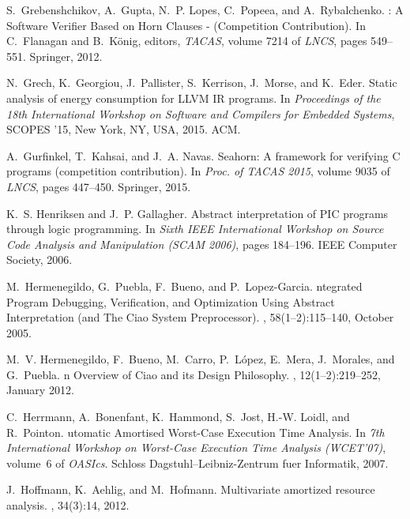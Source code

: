 \documentclass{llncs}
\begin{document}
\begin{thebibliography}{10}
S.~Grebenshchikov, A.~Gupta, N.~P. Lopes, C.~Popeea, and A.~Rybalchenko.
: {A} {S}oftware {V}erifier {B}ased on {H}orn {C}lauses -
  ({C}ompetition {C}ontribution).
\newblock In C.~Flanagan and B.~K{\"o}nig, editors, {\em TACAS}, volume 7214 of
  {\em LNCS}, pages 549--551. Springer, 2012.

N.~Grech, K.~Georgiou, J.~Pallister, S.~Kerrison, J.~Morse, and K.~Eder.
\newblock Static analysis of energy consumption for {LLVM IR} programs.
\newblock In {\em Proceedings of the 18th International Workshop on Software
  and Compilers for Embedded Systems}, SCOPES '15, New York, NY, USA, 2015.
  ACM.

A.~Gurfinkel, T.~Kahsai, and J.~A. Navas.
\newblock Seahorn: {A} framework for verifying {C} programs (competition
  contribution).
\newblock In {\em Proc. of TACAS 2015}, volume 9035 of {\em LNCS}, pages
  447--450. Springer, 2015.

K.~S. Henriksen and J.~P. Gallagher.
\newblock Abstract interpretation of {PIC} programs through logic programming.
\newblock In {\em Sixth IEEE International Workshop on Source Code Analysis and
  Manipulation (SCAM 2006)}, pages 184--196. IEEE Computer Society, 2006.

M.~Hermenegildo, G.~Puebla, F.~Bueno, and P.~Lopez-Garcia.
ntegrated {P}rogram {D}ebugging, {V}erification, and
  {O}ptimization {U}sing {A}bstract {I}nterpretation (and {T}he {C}iao {S}ystem
  {P}reprocessor).
, 58(1--2):115--140, October
  2005.

M.~V. Hermenegildo, F.~Bueno, M.~Carro, P.~L\'{o}pez, E.~Mera, J.~Morales, and
  G.~Puebla.
n {O}verview of {C}iao and its {D}esign {P}hilosophy.
, 12(1--2):219--252,
  January 2012.

C.~Herrmann, A.~Bonenfant, K.~Hammond, S.~Jost, H.-W. Loidl, and R.~Pointon.
utomatic {A}mortised {W}orst-{C}ase {E}xecution {T}ime {A}nalysis.
\newblock In {\em 7th International Workshop on Worst-Case Execution Time
  Analysis (WCET'07)}, volume~6 of {\em OASIcs}. Schloss
  Dagstuhl--Leibniz-Zentrum fuer Informatik, 2007.

J.~Hoffmann, K.~Aehlig, and M.~Hofmann.
\newblock Multivariate amortized resource analysis.
, 34(3):14, 2012.


\end{thebibliography}
\end{document}

